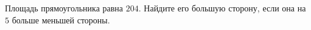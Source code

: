 \begin{ex}
	\begin{condition}
		Площадь прямоугольника равна \( 204 \). Найдите его большую сторону, если она на \( 5 \) больше меньшей стороны.
	\end{condition}
\end{ex}